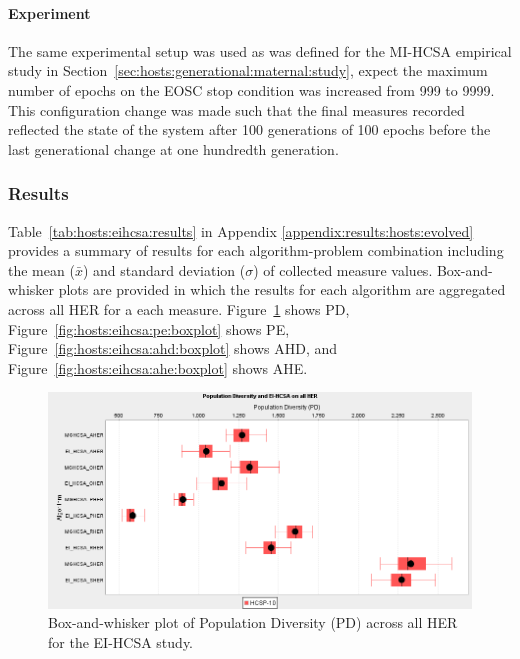 %
%
\paragraph{Experiment}
The same experimental setup was used as was defined for the MI-HCSA empirical study in Section~\ref{sec:hosts:generational:maternal:study}, expect the maximum number of epochs on the EOSC stop condition was increased from 999 to 9999. This configuration change was made such that the final measures recorded reflected the state of the system after 100 generations of 100 epochs before the last generational change at one hundredth generation.

%
%
\subsubsection{Results}
Table~\ref{tab:hosts:eihcsa:results} in Appendix \ref{appendix:results:hosts:evolved} provides a summary of results for each algorithm-problem combination including the mean ($\bar{x}$) and standard deviation ($\sigma$) of collected measure values.  Box-and-whisker plots are provided in which the results for each algorithm are aggregated across all HER for a each measure. Figure~\ref{fig:hosts:eihcsa:pd:boxplot} shows PD, Figure~\ref{fig:hosts:eihcsa:pe:boxplot} shows PE, Figure~\ref{fig:hosts:eihcsa:ahd:boxplot} shows AHD, and Figure~\ref{fig:hosts:eihcsa:ahe:boxplot} shows AHE.

\begin{figure}[htp]
	\centering
		\includegraphics[scale=0.70]{Hosts/EI-HCSA-PD}
	\caption{Box-and-whisker plot of Population Diversity (PD) across all HER for the EI-HCSA study.}
	\label{fig:hosts:eihcsa:pd:boxplot}
\end{figure}

